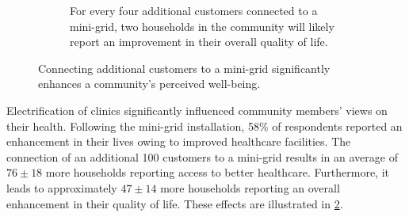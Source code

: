 \begin{figure}[t]
\begin{subfigure}[t]{0.48\textwidth}
		\caption{For every four additional customers connected to a mini-grid, two households in the community will likely report an improvement in their overall quality of life.}
		\label{fig:life_improvement}
	\end{subfigure}
	\caption{Connecting additional customers to a mini-grid significantly enhances a community's perceived well-being.}
	\label{fig:well_being}
\end{figure}

Electrification of clinics significantly influenced community members' views on their health. Following the mini-grid installation, 58\% of respondents reported an enhancement in their lives owing to improved healthcare facilities. The connection of an additional 100 customers to a mini-grid results in an average of $76\pm18$ more households reporting access to better healthcare. Furthermore, it leads to approximately $47\pm14$ more households reporting an overall enhancement in their quality of life. These effects are illustrated in \cref{fig:well_being}.

